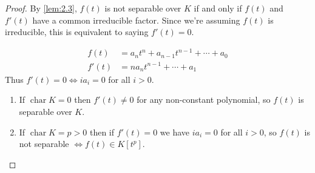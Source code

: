 \documentclass{article}
\DeclareMathOperator{\chara}{char}
\begin{document}
\begin{proof}
    By \cref{lem:2.3}, $f(t)$ is not separable over $K$ if and only if $f(t)$ and $f'(t)$ have a common irreducible factor.
    Since we're assuming $f(t)$ is irreducible, this is equivalent to saying $f'(t) = 0$.

    \begin{align*}
        f(t) &= a_n t^n + a_{n-1} t^{n-1} + \dotsb + a_0 \\
        f'(t) &= n a_n t^{n-1} + \dotsb + a_1
    \end{align*}
    Thus $f'(t) = 0 \iff i a_i = 0$ for all $i > 0$.

    \begin{enumerate}[label=(\roman*)]
        \item If $\chara K = 0$ then $f'(t) \neq 0$ for any non-constant polynomial, so $f(t)$ is separable over $K$.
        \item If $\chara K = p > 0$ then if $f'(t) = 0$ we have $i a_i = 0$ for all $i > 0$, so $f(t)$ is not separable $\iff f(t) \in K[t^p]$. \qedhere
    \end{enumerate}
\end{proof}

\end{document}
